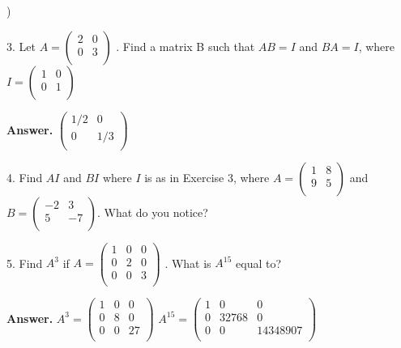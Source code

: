 \documentclass[10pt,]{book}
\theoremstyle{plain}
\theoremstyle{definition}
\theoremstyle{definition}
\theoremstyle{definition}
\theoremstyle{definition}
\begin{document}
\begin{exercisegroup}
\begin{multicols}{2}
\begin{enumerate}[label=\alph*]
\right)\)%
\end{enumerate}
\end{multicols}
%
\par\smallskip
\item[3.]\hypertarget{exercise-3}{} Let \(A =\left(
\begin{array}{cc}
 2 & 0 \\
 0 & 3 \\
\end{array}
\right)\) . Find a matrix B such that \(A B = I\) and \(B A = I\), where \(I = \left(
\begin{array}{cc}
 1 & 0 \\
 0 & 1 \\
\end{array}
\right)\)%
\par\smallskip
\par\smallskip
\noindent\textbf{Answer.}\hypertarget{answer-2}{}\quad
  \(\left(
\begin{array}{cc}
 1/2 & 0 \\
 0 & 1/3 \\
\end{array}
\right)\)
%
\item[4.]\hypertarget{exercise-4}{} Find \(A I\) and \(B I\) where \(I\) is as in Exercise 3, where
\(A = \left(
\begin{array}{cc}
 1 & 8 \\
 9 & 5 \\
\end{array}
\right)\) and \(B = \left(
\begin{array}{cc}
 -2 & 3 \\
 5 & -7 \\
\end{array}
\right)\). 
 What do you notice?%
\par\smallskip
\item[5.]\hypertarget{exercise-5}{} Find \(A^3\) if \(A=\left(
\begin{array}{ccc}
 1 & 0 & 0 \\
 0 & 2 & 0 \\
 0 & 0 & 3 \\
\end{array}
\right)\) . What is \(A^{15}\) equal to?
%
\par\smallskip
\par\smallskip
\noindent\textbf{Answer.}\hypertarget{answer-3}{}\quad
  \(A^3=\left(
\begin{array}{ccc}
 1 & 0 & 0 \\
 0 & 8 & 0 \\
 0 & 0 & 27 \\
\end{array}
\right)\)  \(A^{15}=\left(
\begin{array}{ccc}
 1 & 0 & 0 \\
 0 & 32768 & 0 \\
 0 & 0 & 14348907 \\
\end{array}
\right)\)
%
\end{exercisegroup}
\end{document}
